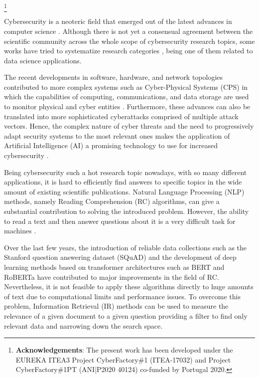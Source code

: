 \documentclass[runningheads]{llncs}
\renewcommand{\thefootnote}{\fnsymbol{footnote}}
\newcommand\blfootnote[1]{%
  \begingroup
  \renewcommand\thefootnote{}\footnote{#1}%
  \addtocounter{footnote}{-1}%
  \endgroup
}
\begin{document}
\blfootnote{\textbf{Acknowledgements}: The present work has been developed under the EUREKA ITEA3 Project CyberFactory\#1 (ITEA-17032) and Project CyberFactory\#1PT (ANI|P2020 40124) co-funded by Portugal 2020.} Cybersecurity is a neoteric field that emerged out of the latest advances in computer science \cite{review1}. Although there is not yet a consensual agreement between the scientific community across the whole scope of cybersecurity research topics, some works have tried to systematize research categories \cite{review1,review2}, being one of them related to data science applications. 

The recent developments in software, hardware, and network topologies contributed to more complex systems such as Cyber-Physical Systems (CPS) in which the capabilities of computing,  communications, and data storage are used to monitor physical and cyber entities \cite{cps}. Furthermore, these advances can also be translated into more sophisticated cyberattacks comprised of multiple attack vectors. Hence, the complex nature of cyber threats and the need to progressively adapt security systems to the most relevant ones makes the application of Artificial Intelligence (AI) a promising technology to use for increased cybersecurity \cite{wirkuttis2017artificial}.

Being cybersecurity such a hot research topic nowadays, with so many different applications, it is hard to efficiently find answers to specific topics in the wide amount of existing scientific publications. Natural Language Processing (NLP) methods, namely Reading Comprehension (RC) algorithms, can give a substantial contribution to solving the introduced problem. However, the ability to read a text and then answer questions about it is a very difficult task for machines \cite{squad}.

Over the last few years, the introduction of reliable data collections such as the Stanford question answering dataset (SQuAD) \cite{squad} and the development of deep learning methods based on transformer architectures \cite{vaswani2017attention} such as BERT \cite{devlin2019bert} and RoBERTa \cite{liu2019roberta} have contributed to major improvements in the field of RC. Nevertheless, it is not feasible to apply these algorithms directly to huge amounts of text due to computational limits and performance issues. To overcome this problem, Information Retrieval (IR) methods \cite{bassil2012survey} can be used to measure the relevance of a given document to a given question providing a filter to find only relevant data and narrowing down the search space.
\end{document}
